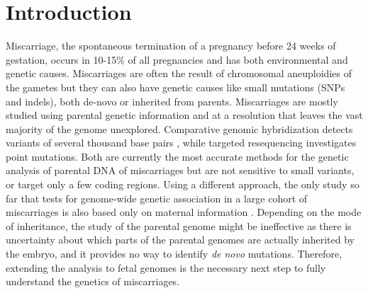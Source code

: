 
\section*{Introduction}

Miscarriage, the spontaneous termination of a pregnancy before 24 weeks of gestation, occurs in  10-15\% of all pregnancies \cite{larsen2013new,ammon2012systematic, andersen2000maternal} and has both environmental and genetic causes\cite{larsen2013new}. Miscarriages are often the result of chromosomal aneuploidies of the gametes but they can also have genetic causes like small mutations (SNPs and indels), both de-novo or inherited from parents. Miscarriages are mostly studied using parental genetic information \cite{pereza2017systematic,quintero2017novel} and at a resolution that leaves the vast majority of the genome unexplored. Comparative genomic hybridization detects variants of several thousand base pairs \cite{robberecht2009diagnosis, kudesia2014rescue,mathur2014miscarriage}, while targeted resequencing investigates point mutations. Both are currently the most accurate methods for the genetic analysis of parental DNA of miscarriages but are not sensitive to small variants, or target only a few coding regions. Using a different approach, the only study so far that tests for genome-wide genetic association in a large cohort of miscarriages is also based only on maternal information \cite{laisk2020genetic}. Depending on the mode of inheritance, the study of the parental genome might be ineffective as there is uncertainty about which parts of the parental genomes are actually inherited by the embryo, and it provides no way to identify \textit{de novo} mutations. Therefore, extending the analysis to fetal genomes is the necessary next step to fully understand the genetics of miscarriages.

